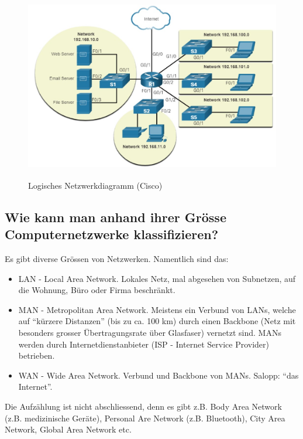 \begin{figure}[H]
    \begin{center}
    \label{pic:logical_topology}
    \includegraphics[width=\textwidth]{images/logical_topology_diagram.jpg}
    \caption{Logisches Netzwerkdiagramm (\textsuperscript{\textcopyright}Cisco)}
    \end{center}
\end{figure}

\subsection*{Wie kann man anhand ihrer Grösse Computernetzwerke klassifizieren?}
Es gibt diverse Grössen von Netzwerken. Namentlich sind das:
\begin{itemize}
    \item LAN\label{LAN} - Local Area Network. Lokales Netz, mal abgesehen von Subnetzen, auf die Wohnung, Büro oder Firma beschränkt.
    \item MAN\label{MAN} - Metropolitan Area Network. Meistens ein Verbund von LANs, welche auf ``kürzere Distanzen'' (bis zu ca. 100 km) durch einen Backbone (Netz mit besonders grosser Übertragungsrate über Glasfaser) vernetzt sind. MANs werden durch Internetdienstanbieter (ISP - Internet Service Provider) betrieben.
    \item WAN\label{WAN} - Wide Area Network. Verbund und Backbone von MANs. Salopp: ``das Internet''.
\end{itemize}
Die Aufzählung ist nicht abschliessend, denn es gibt z.B. Body Area Network (z.B. medizinische Geräte), Personal Are Network (z.B. Bluetooth), City Area Network, Global Area Network etc.


